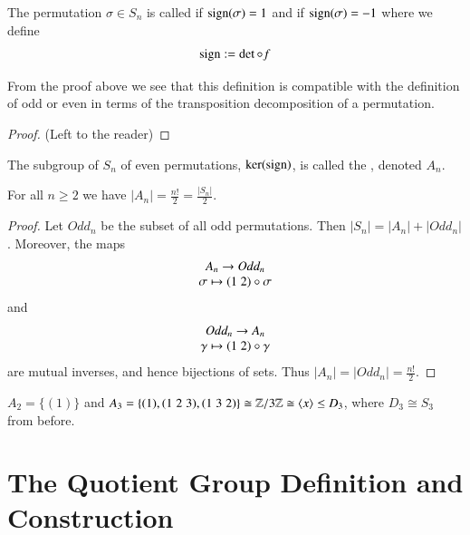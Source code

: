 \documentclass[12pt, a4paper, oneside, openright, titlepage]{book}
\begin{document}
\begin{defn}
        The permutation $\sigma \in S_n$ is called  if $\operatorname{sign}(\sigma) = 1$ and  if $\operatorname{sign}(\sigma) = -1$ where we define \begin{equation}
                \operatorname{sign} := \det \circ f
        \end{equation}
\end{defn}

\begin{rmk}
        From the proof above we see that this definition is compatible with the definition of odd or even in terms of the transposition decomposition of a permutation.
\end{rmk}
\begin{proof}
        (Left to the reader)
\end{proof}


\begin{defn}
        The subgroup of $S_n$ of even permutations, $\ker(\operatorname{sign})$, is called the , denoted $A_n$.
\end{defn}


\begin{prop}
        For all $n \geq 2$ we have $|A_n| = \frac{n!}{2} = \frac{|S_n|}{2}$.
\end{prop}
\begin{proof}
        Let $Odd_n$ be the subset of all odd permutations. Then $|S_n| = |A_n| + |Odd_n|$. Moreover, the maps \begin{equation}
                \begin{array}{c} A_n\rightarrow Odd_n \\ \sigma \mapsto (1\;2)\circ \sigma \end{array}
        \end{equation}
        and \begin{equation}
                \begin{array}{c} Odd_n\rightarrow A_n \\ \gamma \mapsto (1\;2)\circ \gamma \end{array}
        \end{equation}
        are mutual inverses, and hence bijections of sets. Thus $|A_n| = |Odd_n| = \frac{n!}{2}$.
\end{proof}

\begin{eg}
        $A_2 = \{(1)\}$ and $A_3 = \{(1),(1\;2\;3),(1\;3\;2)\} \cong \mathbb Z/3\mathbb Z \cong \langle x\rangle \leq D_3$, where $D_3 \cong S_3$ from before.
\end{eg}




\section{\textsection The Quotient Group Definition and Construction}
\end{document}
